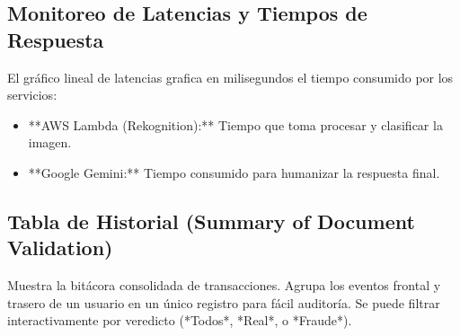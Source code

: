\subsection{Monitoreo de Latencias y Tiempos de Respuesta}
El gráfico lineal de latencias grafica en milisegundos el tiempo consumido por los servicios:
\begin{itemize}
    \item **AWS Lambda (Rekognition):** Tiempo que toma procesar y clasificar la imagen.
    \item **Google Gemini:** Tiempo consumido para humanizar la respuesta final.
\end{itemize}

\subsection{Tabla de Historial (Summary of Document Validation)}
Muestra la bitácora consolidada de transacciones. Agrupa los eventos frontal y trasero de un usuario en un único registro para fácil auditoría. Se puede filtrar interactivamente por veredicto (*Todos*, *Real*, o *Fraude*).
